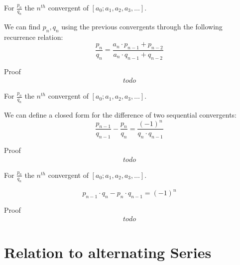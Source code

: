 \documentclass[a4paper]{article}
\begin{document}
    \begin{lemma}
        \label{lemma1}
        For $\frac{p_{n}}{q_n}$ the $n^{th}$ convergent of $[a_0; a_1, a_2, a_3, \dots]$.

        We can find $p_n, q_n$ using the previous convergents through the following recurrence relation:
        \[
        \frac{p_{n}}{q_n} = \frac{a_n \cdot p_{n-1} + p_{n-2}}{a_n \cdot q_{n-1} + q_{n-2}}
        \]

        Proof
        \begin{gather*}
            todo
        \end{gather*}
    \end{lemma}

    \begin{lemma}
        \label{lemma2}
        For $\frac{p_{n}}{q_n}$ the $n^{th}$ convergent of $[a_0; a_1, a_2, a_3, \dots]$.

        We can define a closed form for the difference of two sequential convergents:
        \[
        \frac{p_{n-1}}{q_{n-1}} - \frac{p_{n}}{q_n} = \frac{(-1)^n}{q_n \cdot q_{n-1}}
        \]

        Proof
        \begin{gather*}
            todo
        \end{gather*}
    \end{lemma}

    \begin{lemma}
        \label{lemma3}
        For $\frac{p_{n}}{q_n}$ the $n^{th}$ convergent of $[a_0; a_1, a_2, a_3, \dots]$.

        \[
        p_{n-1} \cdot q_n - p_{n} \cdot q_{n-1} = (-1)^n
        \]

        Proof
        \begin{gather*}
            todo
        \end{gather*}
    \end{lemma}


    \section{Relation to alternating Series}\label{sec:relation-to-alternating-series}
\end{document}
